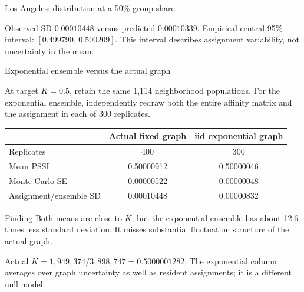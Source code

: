 \begin{frame}{Los Angeles: distribution at a 50\% group share}
\begin{center}
\end{center}\footnotesize Observed SD $0.00010448$ versus predicted $0.00010339$. Empirical central 95\% interval: $[0.499790,\,0.500209]$. This interval describes assignment variability, not uncertainty in the mean.
\end{frame}

\begin{frame}{Exponential ensemble versus the actual graph}
\small

At target $K=0.5$, retain the same 1,114 neighborhood populations.
For the exponential ensemble, independently redraw both the entire affinity matrix and the assignment in each of 300 replicates.
\begin{center}\begin{tabular}{lcc}
 & Actual fixed graph & iid exponential graph\\\hline
Replicates & 400 & 300\\
Mean PSSI & 0.50000912 & 0.50000046\\
Monte Carlo SE & 0.00000522 & 0.00000048\\
Assignment/ensemble SD & 0.00010448 & 0.00000832\\
\end{tabular}\end{center}
\begin{block}{Finding}
Both means are close to $K$, but the exponential ensemble has about 12.6 times less standard deviation. It misses substantial fluctuation structure of the actual graph.
\end{block}
\footnotesize Actual $K=1{,}949{,}374/3{,}898{,}747=0.5000001282$. The exponential column averages over graph uncertainty as well as resident assignments; it is a different null model.

\end{frame}

